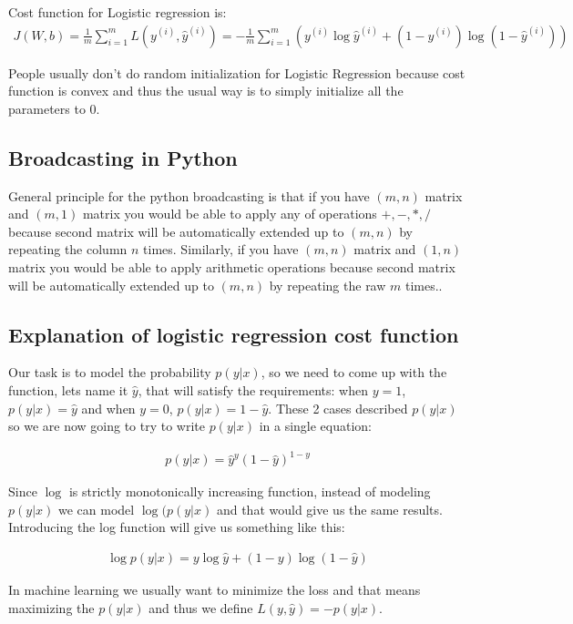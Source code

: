 \documentclass[a4paper]{report}
\begin{document}
Cost function for Logistic regression is:
\begin{align}
J(W, b) = \frac{1}{m}\sum_{i = 1}^{m}L(y^{(i)}, \hat{y}^{(i)}) = -\frac{1}{m}\sum_{i = 1}^{m}(y^{(i)}\log{\hat{y}^{(i)}} + (1 - y^{(i)})\log{(1 - \hat{y}^{(i)})})
\end{align}

People usually don't do random initialization for Logistic Regression because cost function is convex and thus the usual way is to simply initialize all the parameters to $0$.

\subsection{Broadcasting in Python}

General principle for the python broadcasting is that if you have $(m, n)$ matrix and $(m, 1)$ matrix you would be able to apply any of operations $+, -, *, /$ because second matrix will be automatically extended up to $(m, n)$ by repeating the column $n$ times. Similarly, if you have $(m, n)$ matrix and $(1, n)$ matrix you would be able to apply arithmetic operations because second matrix will be automatically extended up to $(m, n)$ by repeating the raw $m$ times..
  
\subsection{Explanation of logistic regression cost function}

Our task is to model the probability $p(y|x)$, so we need to come up with the function, lets name it $\hat{y}$, that will satisfy the requirements: when $y = 1$, $p(y|x) = \hat{y}$ and when $y = 0$, $p(y|x) = 1 - \hat{y}$. These 2 cases described $p(y|x)$ so we are now going to try to write $p(y|x)$ in a single equation: 

\begin{align}
p(y|x) = \hat{y}^y (1 - \hat{y})^{1 - y}
\end{align}

Since $\log$ is strictly monotonically increasing function, instead of modeling $p(y|x)$ we can model $\log(p(y|x)$ and that would give us the same results. Introducing the log function will give us something like this:

\begin{align}
\log{p(y|x)} = y\log{\hat{y}} + (1 - y)\log{(1 - \hat{y})}
\end{align}

In machine learning we usually want to minimize the loss and that means maximizing the $p(y|x)$ and thus we define $L(y, \hat{y}) = -p(y|x)$.
\end{document}
